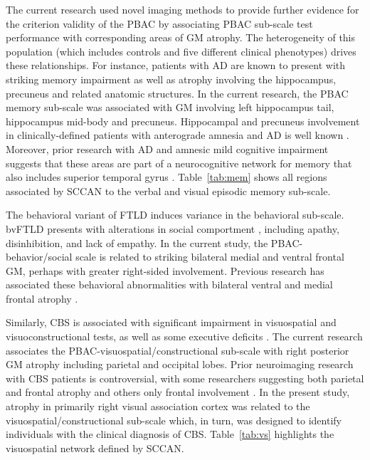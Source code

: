 \documentclass[preprint,authoryear,12pt]{elsarticle}
\begin{document}
The current research used novel imaging methods to provide further evidence for the criterion validity of the PBAC by associating PBAC sub-scale test performance with corresponding areas of GM atrophy.  The heterogeneity of this population (which includes controls and five different clinical phenotypes) drives these relationships.  For instance, patients with AD are known to present with striking memory impairment as well as atrophy involving the hippocampus, precuneus and related anatomic structures.  In the current research, the PBAC memory sub-scale was associated with GM involving left hippocampus tail, hippocampus mid-body and precuneus.   Hippocampal and precuneus involvement in clinically-defined patients with anterograde amnesia and AD is well known \citet{Nestor2002b,Pengas2010}.  Moreover, prior research with AD and amnesic mild cognitive impairment suggests that these areas are part of a neurocognitive network for memory that also includes superior temporal gyrus \citet{Delano-Wood2012,Gardini2011}.  Table~\ref{tab:mem} shows all regions associated by SCCAN to the verbal and visual episodic memory sub-scale. 

The behavioral variant of FTLD induces variance in the behavioral sub-scale.  bvFTLD presents with alterations in social comportment \citet{Rascovsky2011,Shany-Ur2011}, including apathy, disinhibition, and lack of empathy.  In the current study, the PBAC-behavior/social scale is related to striking bilateral medial and ventral frontal GM, perhaps with greater right-sided involvement.  Previous research has associated these behavioral abnormalities with bilateral ventral and medial frontal atrophy \citet{Massimo2009,Rosen2010}.  

Similarly, CBS is associated with significant impairment in visuospatial and visuoconstructional tests, as well as some executive deficits \citet{Libon2007,Libon2009}.  The current research associates the PBAC-visuospatial/constructional sub-scale with right posterior GM atrophy including parietal and occipital lobes.  Prior neuroimaging research with CBS patients is controversial, with some researchers suggesting both parietal and frontal atrophy \citet{Grossman2004b} and others only frontal involvement \citet{Hassan2011}.  In the present study, atrophy in primarily right visual association cortex was related to the visuospatial/constructional sub-scale which, in turn, was designed to identify individuals with the clinical diagnosis of CBS.  Table~\ref{tab:vs} highlights the visuospatial network defined by SCCAN.
\end{document}

